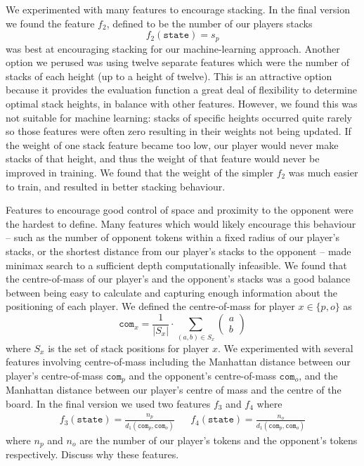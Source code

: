 \documentclass[11pt]{article}
\newcommand{\drafting}[1]{\textcolor{OliveGreen}{#1}}
\begin{document}
We experimented with many features to encourage stacking. In the final version we found the feature $f_2$, defined to be the number of our players stacks
\[
    f_2(\texttt{state}) = s_p 
\]
was best at encouraging stacking for our machine-learning approach. Another option we perused was using twelve separate features which were the number of stacks of each height (up to a height of twelve). This is an attractive option because it provides the evaluation function a great deal of flexibility to determine optimal stack heights, in balance with other features. However, we found this was not suitable for machine learning: stacks of specific heights occurred quite rarely so those features were often zero resulting in their weights not being updated. If the weight of one stack feature became too low, our player would never make stacks of that height, and thus the weight of that feature would never be improved in training. We found that the weight of the simpler $f_2$ was much easier to train, and resulted in better stacking behaviour.

Features to encourage good control of space and proximity to the opponent were the hardest to define. Many features which would likely encourage this behaviour -- such as the number of opponent tokens within a fixed radius of our player's stacks, or the shortest distance from our player's stacks to the opponent -- made minimax search to a sufficient depth computationally infeasible. We found that the centre-of-mass of our player's and the opponent's stacks was a good balance between being easy to calculate and capturing enough information about the positioning of each player. We defined the centre-of-mass for player $x \in \{p, o\}$ as 
\[
    \texttt{com}_x = \frac{1}{|S_x|} \cdot \sum _{(a, b) \in S_x} \begin{pmatrix}
        a \\ b
    \end{pmatrix}
\]
where $S_x$ is the set of stack positions for player $x$. We experimented with several features involving centre-of-mass including the Manhattan distance between our player's centre-of-mass $\texttt{com}_p$ and the opponent's centre-of-mass $\texttt{com}_o$, and the Manhattan distance between our player's centre of mass and the centre of the board. In the final version we used two features $f_3$ and $f_4$ where
\begin{align*}
    f_3(\texttt{state}) = \frac{n_p}{d_1(\texttt{com}_p, \texttt{com}_o)} && f_4(\texttt{state}) = \frac{n_o}{d_1(\texttt{com}_p, \texttt{com}_o)} 
\end{align*}
where $n_p$ and $n_o$ are the number of our player's tokens and the opponent's tokens respectively. \drafting{Discuss why these features.}
\end{document}
